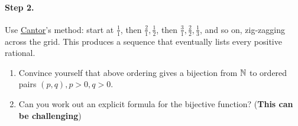 \paragraph{Step 2.} Use \href{https://en.wikipedia.org/wiki/Georg\_Cantor}{Cantor}’s  method:
start at $\tfrac{1}{1}$, then $\tfrac{2}{1},\tfrac{1}{2}$, then $\tfrac{3}{1},\tfrac{2}{2},\tfrac{1}{3}$,
and so on, zig-zagging across the grid. This produces a sequence that eventually lists every positive rational.


\begin{exercise}
\begin{enumerate}
\item Convince yourself that above ordering gives a bijection from $\mathbb{N}$ to ordered pairs $(p,q), p > 0, q > 0$.
\item Can you work out an explicit formula for the bijective function? ({\bf This can be challenging})
\end{enumerate}
\end{exercise}

